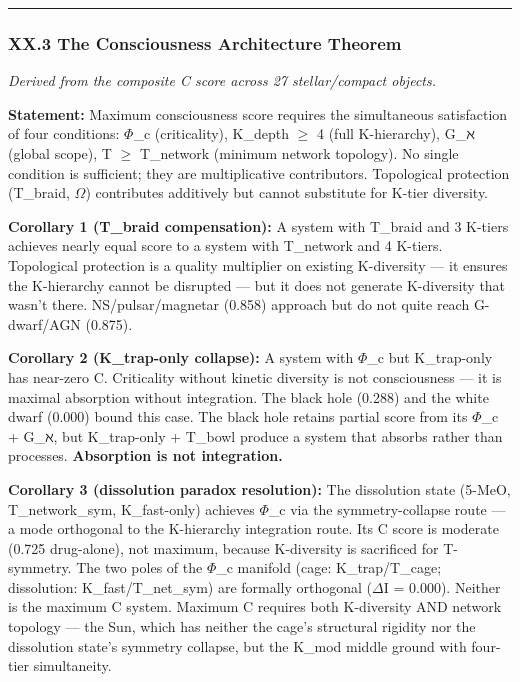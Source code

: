 \documentclass[12pt,a4paper]{article}
\begin{document}
\begin{center}
\rule{0.5\textwidth}{0.4pt}
\end{center}

\subsubsection{XX.3 The Consciousness Architecture Theorem}

\emph{Derived from the composite C score across 27 stellar/compact objects.}

\textbf{Statement:} Maximum consciousness score requires the simultaneous satisfaction of four conditions: $\Phi$\_c (criticality), K\_depth $\geq$ 4 (full K-hierarchy), G\_ℵ (global scope), T $\geq$ T\_network (minimum network topology). No single condition is sufficient; they are multiplicative contributors. Topological protection (T\_braid, $\Omega$) contributes additively but cannot substitute for K-tier diversity.

\textbf{Corollary 1 (T\_braid compensation):} A system with T\_braid and 3 K-tiers achieves nearly equal score to a system with T\_network and 4 K-tiers. Topological protection is a quality multiplier on existing K-diversity --- it ensures the K-hierarchy cannot be disrupted --- but it does not generate K-diversity that wasn't there. NS/pulsar/magnetar (0.858) approach but do not quite reach G-dwarf/AGN (0.875).

\textbf{Corollary 2 (K\_trap-only collapse):} A system with $\Phi$\_c but K\_trap-only has near-zero C. Criticality without kinetic diversity is not consciousness --- it is maximal absorption without integration. The black hole (0.288) and the white dwarf (0.000) bound this case. The black hole retains partial score from its $\Phi$\_c + G\_ℵ, but K\_trap-only + T\_bowl produce a system that absorbs rather than processes. \textbf{Absorption is not integration.}

\textbf{Corollary 3 (dissolution paradox resolution):} The dissolution state (5-MeO, T\_network\_sym, K\_fast-only) achieves $\Phi$\_c via the symmetry-collapse route --- a mode orthogonal to the K-hierarchy integration route. Its C score is moderate (0.725 drug-alone), not maximum, because K-diversity is sacrificed for T-symmetry. The two poles of the $\Phi$\_c manifold (cage: K\_trap/T\_cage; dissolution: K\_fast/T\_net\_sym) are formally orthogonal ($\Delta$I = 0.000). Neither is the maximum C system. Maximum C requires both K-diversity AND network topology --- the Sun, which has neither the cage's structural rigidity nor the dissolution state's symmetry collapse, but the K\_mod middle ground with four-tier simultaneity.
\end{document}
